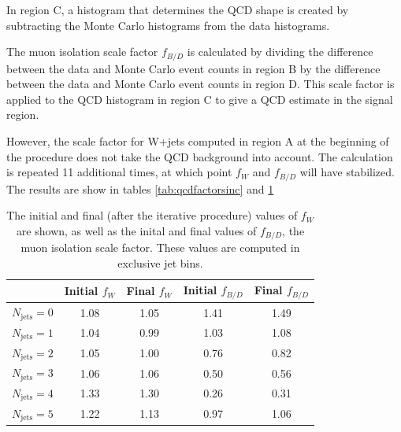\documentclass[oneside, letterpaper, oldfontcommands]{memoir}
\begin{document}
\qquad In region C, a histogram that determines the QCD shape is created by subtracting the Monte Carlo histograms from the data histograms. 

\qquad The muon isolation scale factor $f_{B/D}$ is calculated by dividing the difference between the data and Monte Carlo event counts in region B by the difference between the data and Monte Carlo event counts in region D. This scale factor is applied to the QCD histogram in region C to give a QCD estimate in the signal region. 

\qquad However, the scale factor for W+jets computed in region A at the beginning of the procedure does not take the QCD background into account. The calculation is repeated 11 additional times, at which point $f_{W}$ and $f_{B/D}$ will have stabilized. The results are show in tables \ref{tab:qcdfactorsinc} and \ref{tab:qcdfactorsexc}
 
\begin{table}
\centering
\caption{The initial and final (after the iterative procedure) values of $f_{W}$ are shown, as well as the inital and final values of $f_{B/D}$, the muon isolation scale factor. These values are computed in exclusive jet bins.}
\footnotesize{
\begin{tabular}{l|cccc}
  &  Initial $f_{W}$ & Final $f_{W}$ & Initial $f_{B/D}$ & Final $f_{B/D}$ \\ \hline
   $N_{\text{jets}} = 0$        & 1.08 & 1.05 & 1.41 & 1.49 \\
   $N_{\text{jets}} = 1$        & 1.04 & 0.99 & 1.03 & 1.08 \\
   $N_{\text{jets}} = 2$        & 1.05 & 1.00 & 0.76 & 0.82 \\
   $N_{\text{jets}} = 3$        & 1.06 & 1.06 & 0.50 & 0.56 \\
   $N_{\text{jets}} = 4$        & 1.33 & 1.30 & 0.26 & 0.31 \\
   $N_{\text{jets}} = 5$        & 1.22 & 1.13 & 0.97 & 1.06 \\
 \hline
 \end{tabular}}
\label{tab:qcdfactorsexc}
\end{table} 
\end{document}
